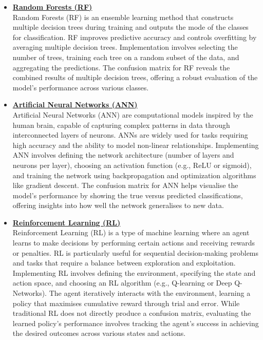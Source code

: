 \documentclass[12pt,a4paper]{report}
\begin{document}
\begin{spacing}{1.5}
\begin{itemize}
\\
\item\underline{\textbf{Random Forests (RF)}} \\ 
Random Forests (RF) is an ensemble learning method that constructs multiple decision trees during training and outputs the mode of the classes for classification. RF improves predictive accuracy and controls overfitting by averaging multiple decision trees. Implementation involves selecting the number of trees, training each tree on a random subset of the data, and aggregating the predictions. The confusion matrix for RF reveals the combined results of multiple decision trees, offering a robust evaluation of the model’s performance across various classes.
\\
\item\underline{\textbf{Artificial Neural Networks (ANN)}} \\ 
Artificial Neural Networks (ANN) are computational models inspired by the human brain, capable of capturing complex patterns in data through interconnected layers of neurons. ANNs are widely used for tasks requiring high accuracy and the ability to model non-linear relationships. Implementing ANN involves defining the network architecture (number of layers and neurons per layer), choosing an activation function (e.g., ReLU or sigmoid), and training the network using backpropagation and optimization algorithms like gradient descent. The confusion matrix for ANN helps visualise the model’s performance by showing the true versus predicted classifications, offering insights into how well the network generalises to new data.
\\
\item\underline{\textbf{Reinforcement Learning (RL)}} \\ 
Reinforcement Learning (RL) is a type of machine learning where an agent learns to make decisions by performing certain actions and receiving rewards or penalties. RL is particularly useful for sequential decision-making problems and tasks that require a balance between exploration and exploitation. Implementing RL involves defining the environment, specifying the state and action space, and choosing an RL algorithm (e.g., Q-learning or Deep Q-Networks). The agent iteratively interacts with the environment, learning a policy that maximises cumulative reward through trial and error. While traditional RL does not directly produce a confusion matrix, evaluating the learned policy’s performance involves tracking the agent’s success in achieving the desired outcomes across various states and actions.
\end{itemize}


\end{spacing}
\end{document}
